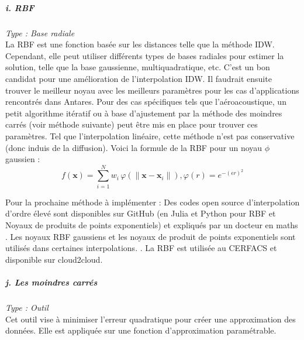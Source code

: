 
\newpage

\subparagraph{i. RBF \cite{opencfs}}
\textit{Type : Base radiale} \\
\phantom{----}La \ac{RBF} est une fonction basée sur les distances telle que la méthode IDW. Cependant, elle peut utiliser différents types de bases radiales pour estimer la solution, telle que la base gaussienne, multiquadratique, etc. C'est un bon candidat pour une amélioration de l'interpolation IDW. Il faudrait ensuite trouver le meilleur noyau avec les meilleurs paramètres pour les cas d'applications rencontrés dans Antares. Pour des cas spécifiques tels que l'aéroacoustique, un petit algorithme itératif ou à base d'ajustement par la méthode des moindres carrés (voir méthode suivante) peut être mis en place pour trouver ces paramètres. Tel que l'interpolation linéaire, cette méthode n'est pas conservative (donc induis de la diffusion).
Voici la formule de la RBF pour un noyau \(\phi\) gaussien :
\begin{equation}
f(\mathbf{x}) = \sum_{i=1}^{N} w_{i} \, \varphi \left( \|\mathbf{x} - \mathbf{x}_{i}\| \right), \varphi(r) = e^{-(\epsilon r)^{2}}
\end{equation}

Pour la prochaine méthode à implémenter : Des codes open source d'interpolation d'ordre élevé sont disponibles sur GitHub (en Julia \cite{opensource} et Python \cite{opensource_2} pour RBF et Noyaux de produits de points exponentiels) et expliqués par un docteur en maths \cite{Rosenfeld}. Les noyaux RBF gaussiens et les noyaux de produit de points exponentiels sont utilisés dans certaines interpolations. \cite{opensource_2}. La RBF est utilisée au CERFACS et disponible sur cloud2cloud.

\subparagraph{j. Les moindres carrés} %
\textit{Type : Outil} \\ %
\phantom{----}
Cet outil vise à minimiser l'erreur quadratique pour créer une approximation des données. Elle est appliquée sur une fonction d'approximation paramétrable.

